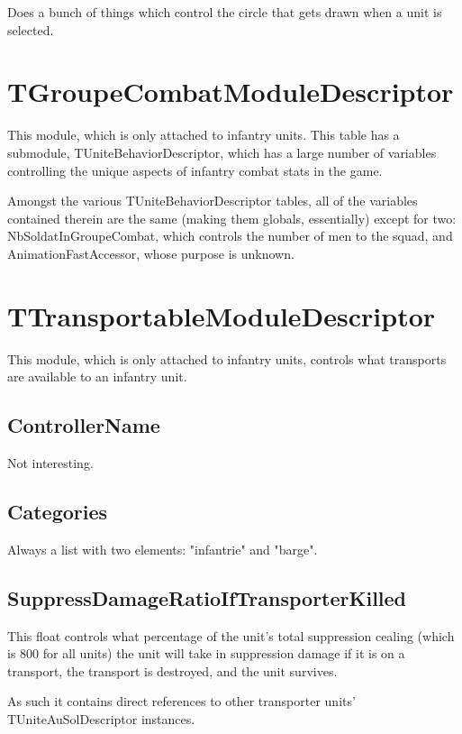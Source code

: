 \documentclass{article}
\begin{document}
Does a bunch of things which control the circle that gets drawn when a unit is selected.

\section{TGroupeCombatModuleDescriptor}

This module, which is only attached to infantry units. This table has a submodule, TUniteBehaviorDescriptor, which has a large number of variables controlling the unique aspects of infantry combat stats in the game.

Amongst the various TUniteBehaviorDescriptor tables, all of the variables contained therein are the same (making them globals, essentially) except for two: NbSoldatInGroupeCombat, which controls the number of men to the squad, and AnimationFastAccessor, whose purpose is unknown.

\section{TTransportableModuleDescriptor}

This module, which is only attached to infantry units, controls what transports are available to an infantry unit.

\subsection{ControllerName}

Not interesting.

\subsection{Categories}

Always a list with two elements: "infantrie" and "barge".

\subsection{SuppressDamageRatioIfTransporterKilled}

This float controls what percentage of the unit's total suppression cealing (which is 800 for all units) the unit will take in suppression damage if it is on a transport, the transport is destroyed, and the unit survives.

As such it contains direct references to other transporter units' TUniteAuSolDescriptor instances.
\end{document}
